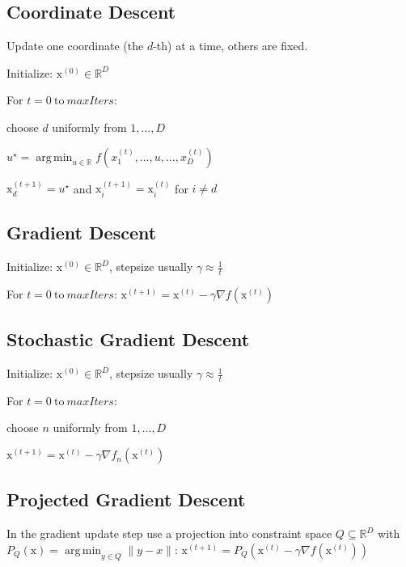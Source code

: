 \documentclass[a4paper, 11pt, landscape]{article}
\newcommand{\matr}[1]{\boldsymbol{\mathrm{#1}}}
\DeclareMathOperator*{\argmin}{arg\,min}
\begin{document}
\begin{multicols*}{3}
\subsection{Coordinate Descent}
Update one coordinate (the $d$-th) at a time, others are fixed.
\begin{inparaenum}
	\item Initialize: $\matr{x}^{(0)} \in \mathbb{R}^D$
	\item For $t = 0 \ \text{to} \ \mathit{maxIters}$:
	\item choose $d$ uniformly from $1, \ldots, D$
	\item $u^\star = \argmin_{u \in \mathbb{R}} f(x_1^{(t)}, \ldots, u, \ldots, x_D^{(t)})$
	\item $\matr{x}_d^{(t+1)} = u^\star$ and $\matr{x}_i^{(t+1)} = \matr{x}_i^{(t)}$ for $i \neq d$
\end{inparaenum}

\subsection{Gradient Descent}
\begin{inparaenum}
	\item Initialize: $\matr{x}^{(0)} \in \mathbb{R}^D$, stepsize usually $\gamma \approx \frac{1}{t}$
	\item For $t = 0 \ \text{to} \ \mathit{maxIters}$: $\matr{x}^{(t+1)} = \matr{x}^{(t)} - \gamma \nabla f(\matr{x}^{(t)})$
\end{inparaenum}

\subsection{Stochastic Gradient Descent}
\begin{inparaenum}
	\item Initialize: $\matr{x}^{(0)} \in \mathbb{R}^D$, stepsize usually $\gamma \approx \frac{1}{t}$
	\item For $t = 0 \ \text{to} \ \mathit{maxIters}$:
	\item choose $n$ uniformly from $1, \ldots, D$
	\item $\matr{x}^{(t+1)} = \matr{x}^{(t)} - \gamma \nabla f_n(\matr{x}^{(t)})$
\end{inparaenum}

\subsection{Projected Gradient Descent}
In the gradient update step use a projection into constraint space $Q \subseteq \mathbb{R}^D$ with $P_Q(\matr{x}) = \argmin_{y \in Q} \|y - x\|$: $\matr{x}^{(t+1)} = P_Q\left(\matr{x}^{(t)} - \gamma \nabla f(\matr{x}^{(t)})\right)$


\end{multicols*}
\end{document}
